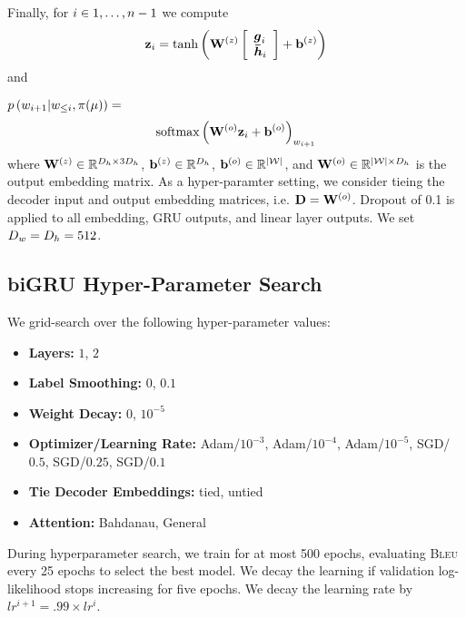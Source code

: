 Finally, for $i \in 1, \ldots, n-1$ we compute
\begin{align*}
\mathbf{z}_i =  \tanh\left(\mathbf{W}^{(z)}\left[\begin{array}{l} 
    \boldsymbol{g}_i\\ \boldsymbol{\bar{h}}_i \end{array}\right] + \mathbf{b}^{(z)}\right) \\
\end{align*} and 

\noindent $p\left(w_{i+1}|w_{\le i}, \pi(\mu)\right)  =$
\begin{align*}
    \operatorname{softmax}\left(\mathbf{W}^{(o)}\mathbf{z}_i + \mathbf{b}^{(o)}\right)_{w_{i+1}}  
\end{align*}
where $\mathbf{W}^{(z)} \in \mathbb{R}^{{D_h} \times 3{D_h}}$, $\mathbf{b}^{(z)} \in\mathbb{R}^{{D_h}}$, 
$\mathbf{b}^{(o)} \in \mathbb{R}^{{\lvert \mathcal{W} \rvert}}$,
and $\mathbf{W}^{(o)} \in \mathbb{R}^{{\lvert \mathcal{W} \rvert} \times {D_h}}$ is the output
    embedding matrix. 
    As a hyper-paramter setting, we consider tieing the decoder 
    input and output
    embedding matrices, i.e. $\mathbf{D} = \mathbf{W}^{(o)}$.
    Dropout of 0.1 is applied to all embedding, GRU outputs, and linear
    layer outputs. We set ${D_w} = {D_h} = 512$.

\subsection{biGRU Hyper-Parameter Search}

We grid-search over the following hyper-parameter values:

\begin{itemize}
    \item \textbf{Layers:}  $1$, $2$ 
    \item \textbf{Label Smoothing:} $0$, $0.1$
    \item \textbf{Weight Decay:} $0$, $10^{-5}$
    \item \textbf{Optimizer/Learning Rate:} Adam/$10^{-3}$, Adam/$10^{-4}$, Adam/$10^{-5}$,
        SGD/$0.5$, SGD/$0.25$, SGD/$0.1$
    \item \textbf{Tie Decoder Embeddings:} tied, untied
     \item \textbf{Attention:} Bahdanau, General
       \end{itemize}

During hyperparameter search, we train for at most 500
epochs, evaluating \textsc{Bleu} every 25 epochs to select the best model.
We decay the learning if validation log-likelihood stops increasing 
for five epochs. We decay the learning rate by $lr^{i+1}= .99 \times lr^{i}$.

